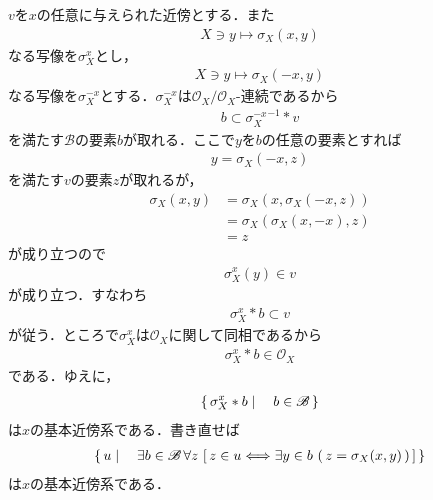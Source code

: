 	\begin{sketch}
		$v$を$x$の任意に与えられた近傍とする．また
		\begin{align}
			X \ni y \longmapsto \sigma_X(x,y)
		\end{align}
		なる写像を$\sigma_X^x$とし，
		\begin{align}
			X \ni y \longmapsto \sigma_X(-x,y)
		\end{align}
		なる写像を$\sigma_X^{-x}$とする．$\sigma_X^{-x}$は$\mathscr{O}_X/\mathscr{O}_X$-連続であるから
		\begin{align}
			b \subset {\sigma_X^{-x}}^{-1} \ast v
		\end{align}
		を満たす$\mathscr{B}$の要素$b$が取れる．ここで$y$を$b$の任意の要素とすれば
		\begin{align}
			y = \sigma_X(-x,z)
		\end{align}
		を満たす$v$の要素$z$が取れるが，
		\begin{align}
			\sigma_X(x,y) &= \sigma_X\left(x,\sigma_X(-x,z)\right) \\
			&= \sigma_X\left(\sigma_X(x,-x),z\right) \\
			&= z
		\end{align}
		が成り立つので
		\begin{align}
			\sigma_X^x(y) \in v
		\end{align}
		が成り立つ．すなわち
		\begin{align}
			\sigma_X^x \ast b \subset v
		\end{align}
		が従う．ところで$\sigma_X^x$は$\mathscr{O}_X$に関して同相であるから
		\begin{align}
			\sigma_X^x \ast b \in \mathscr{O}_X
		\end{align}
		である．ゆえに，
		\begin{align}
			\left\{\, \sigma_X^x \ast b \mid \quad b \in \mathscr{B}\, \right\}
		\end{align}
		は$x$の基本近傍系である．書き直せば
		\begin{align}
			\left\{\, u \mid \quad \exists b \in \mathscr{B}\, 
			\forall z\, \left[\, z \in u \Longleftrightarrow \exists y \in b\, \left(\, z=\sigma_X(x,y)\, \right) \, \right]\, \right\}
		\end{align}
		は$x$の基本近傍系である．
		\QED
	\end{sketch}
	
